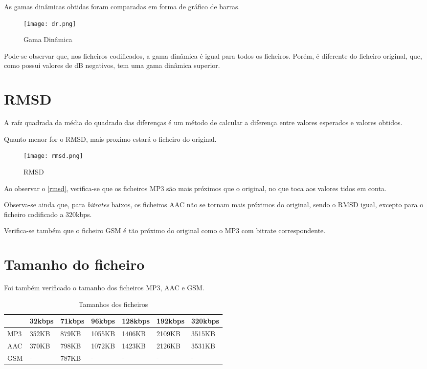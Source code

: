 \documentclass[a4paper]{report}
\begin{document}
As gamas dinâmicas obtidas foram comparadas em forma de gráfico de barras.

\begin{figure}[ht]
 \texttt{[image: dr.png]}
 \caption{Gama Dinâmica}
 \label{dr}
\end{figure}

Pode-se observar que, nos ficheiros codificados, a gama dinâmica é igual para todos os ficheiros. Porém, é diferente do ficheiro original, que, como possui valores de dB negativos, tem uma gama dinâmica superior.

\section{RMSD}

A raíz quadrada da média do quadrado das diferenças é um método de calcular a diferença entre valores esperados e valores obtidos. 

Quanto menor for o \gls{RMSD}, mais proximo estará o ficheiro do original.
\\
\begin{figure}[ht]
 \texttt{[image: rmsd.png]}
 \caption{RMSD}
 \label{rmsd}
\end{figure}

Ao observar o \autoref{rmsd}, verifica-se que os ficheiros \gls{MP3} são mais próximos que o original, no que toca aos valores tidos em conta.

Observa-se ainda que, para \textit{bitrates} baixos, os ficheiros \gls{AAC} não se tornam mais próximos do original, sendo o \gls{RMSD} igual, excepto para o ficheiro codificado a 320kbps.

Verifica-se também que o ficheiro \gls{GSM} é tão próximo do original como o \gls{MP3} com \gls{bitrate} correspondente.

\section{Tamanho do ficheiro}
\label{filesize}
Foi também verificado o tamanho dos ficheiros \gls{MP3}, \gls{AAC} e \gls{GSM}.
\\[5pt]

\begin{table}[h]
 \begin{center}
  \begin{tabularx}{\textwidth}{|X|X|X|X|X|X|X|}
    \hline 
            & 32kbps & 71kbps & 96kbps & 128kbps & 192kbps & 320kbps \\ 
    \hline 
        MP3 & 352KB & 879KB & 1055KB & 1406KB & 2109KB & 3515KB \\ 
    \hline 
        AAC & 370KB & 798KB & 1072KB & 1423KB & 2126KB & 3531KB \\ 
    \hline 
        GSM & - & 787KB & - & - & - & - \\ 
    \hline 
  \end{tabularx} \\
  \vspace{-5pt}
  \caption{Tamanhos dos ficheiros}
  \label{size}
 \end{center}
\end{table}
\end{document}
